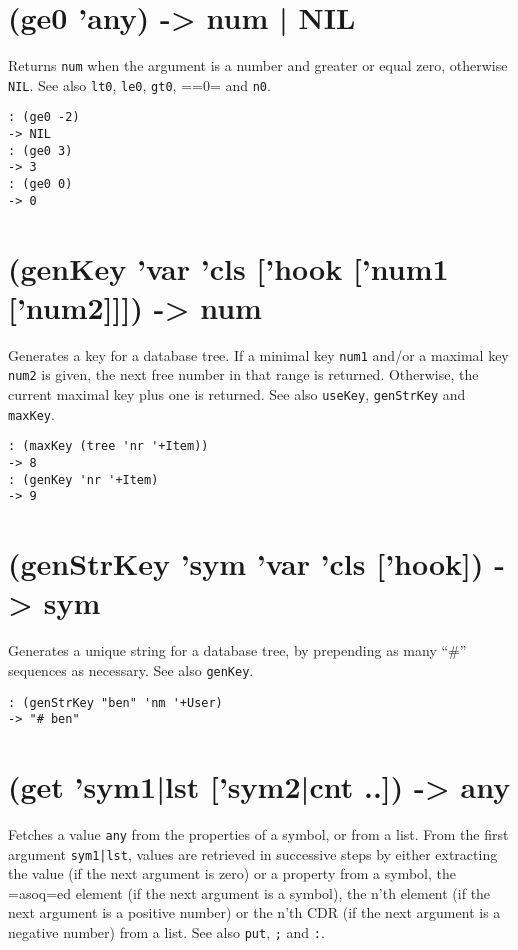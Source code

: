 {{{{{{ 
\section{(ge0 'any) -> num | NIL}
\label{sec-8-1-7-2}


Returns \texttt{num} when the argument is a number and greater or equal zero,
otherwise \texttt{NIL}. See also \texttt{lt0}, \texttt{le0}, \texttt{gt0}, ==0= and \texttt{n0}.


\begin{verbatim}
: (ge0 -2)
-> NIL
: (ge0 3)
-> 3
: (ge0 0)
-> 0
\end{verbatim}

 
\section{(genKey 'var 'cls ['hook ['num1 ['num2]]]) -> num}
\label{sec-8-1-7-3}


Generates a key for a database tree. If a minimal key \texttt{num1} and/or a
maximal key \texttt{num2} is given, the next free number in that range is
returned. Otherwise, the current maximal key plus one is returned. See
also \texttt{useKey}, \texttt{genStrKey} and \texttt{maxKey}.


\begin{verbatim}
: (maxKey (tree 'nr '+Item))
-> 8
: (genKey 'nr '+Item)
-> 9
\end{verbatim}

 
\section{(genStrKey 'sym 'var 'cls ['hook]) -> sym}
\label{sec-8-1-7-4}


Generates a unique string for a database tree, by prepending as many ``\#''
sequences as necessary. See also \texttt{genKey}.


\begin{verbatim}
: (genStrKey "ben" 'nm '+User)
-> "# ben"
\end{verbatim}

 
\section{(get 'sym1|lst ['sym2|cnt ..]) -> any}
\label{sec-8-1-7-5}


Fetches a value \texttt{any} from the properties of a symbol, or from a list.
From the first argument \texttt{sym1|lst}, values are retrieved in successive
steps by either extracting the value (if the next argument is zero) or a
property from a symbol, the =asoq=ed element (if the next argument is a
symbol), the n'th element (if the next argument is a positive number) or
the n'th CDR (if the next argument is a negative number) from a list.
See also \texttt{put}, \texttt{;} and \texttt{:}.


}}}}}}
